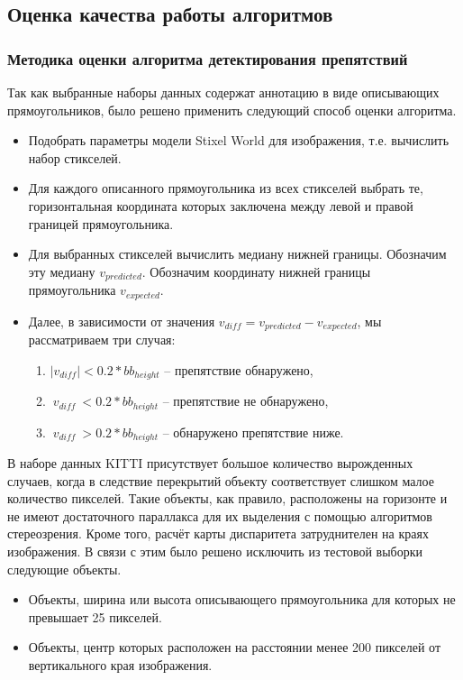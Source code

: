 \documentclass[aps,%
14pt,%
final,%
oneside,
onecolumn,%
musixtex, %
superscriptaddress,%
centertags]{extarticle} %
\begin{document}
\subsection{Оценка качества работы алгоритмов}

\subsubsection{Методика оценки алгоритма детектирования препятствий}

Так как выбранные наборы данных содержат аннотацию в виде описывающих прямоугольников, было решено применить следующий способ оценки алгоритма. 
\begin{itemize}
\item Подобрать параметры модели Stixel World для изображения, т.е. вычислить набор стикселей.
\item Для каждого описанного прямоугольника из всех стикселей выбрать те, горизонтальная координата которых заключена между левой и правой границей прямоугольника.
\item Для выбранных стикселей вычислить медиану нижней границы. Обозначим эту медиану $v_{predicted}$. Обозначим координату нижней границы прямоугольника $v_{expected}$.
\item Далее, в зависимости от значения $v_{diff} = v_{predicted} - v_{expected}$, мы рассматриваем три случая:
\begin{enumerate}
\item $|v_{diff}|   < 0.2 * bb_{height}$    -- препятствие обнаружено,
\item $\ v_{diff}\  < 0.2 * bb_{height}$  -- препятствие не обнаружено,
\item $\ v_{diff}\  > 0.2 * bb_{height}$  -- обнаружено препятствие ниже.
\end{enumerate}
\end{itemize}

В наборе данных KITTI присутствует большое количество вырожденных случаев, когда в следствие перекрытий объекту соответствует слишком малое количество пикселей. Такие объекты, как правило, расположены на горизонте и не имеют достаточного параллакса для их выделения с помощью алгоритмов стереозрения. Кроме того, расчёт карты диспаритета затруднителен на краях изображения. В связи с этим было решено исключить из тестовой выборки следующие объекты.
\begin{itemize}
\item Объекты, ширина или высота описывающего прямоугольника для которых не превышает 25 пикселей.
\item Объекты, центр которых расположен на расстоянии менее 200 пикселей от вертикального края изображения.
\end{itemize}
\end{document}
